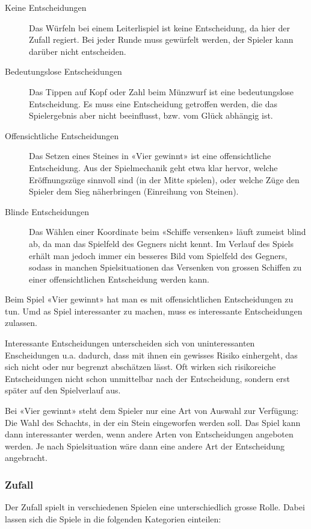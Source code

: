 \documentclass[a4paper,11pt,hidelinks]{scrartcl}
\begin{document}
\begin{description}
    \item[Keine Entscheidungen] Das Würfeln bei einem Leiterlispiel ist keine Entscheidung, da hier der Zufall regiert. Bei jeder Runde muss gewürfelt werden, der Spieler kann darüber nicht entscheiden.
    \item[Bedeutungslose Entscheidungen] Das Tippen auf Kopf oder Zahl beim Münzwurf ist eine bedeutungslose Entscheidung. Es muss eine Entscheidung getroffen werden, die das Spielergebnis aber nicht beeinflusst, bzw. vom Glück abhängig ist.
    \item[Offensichtliche Entscheidungen] Das Setzen eines Steines in «Vier gewinnt» ist eine offensichtliche Entscheidung. Aus der Spielmechanik geht etwa klar hervor, welche Eröffnungszüge sinnvoll sind (in der Mitte spielen), oder welche Züge den Spieler dem Sieg näherbringen (Einreihung von Steinen).
    \item[Blinde Entscheidungen] Das Wählen einer Koordinate beim «Schiffe versenken» läuft zumeist blind ab, da man das Spielfeld des Gegners nicht kennt. Im Verlauf des Spiels erhält man jedoch immer ein besseres Bild vom Spielfeld des Gegners, sodass in manchen Spielsituationen das Versenken von grossen Schiffen zu einer offensichtlichen Entscheidung werden kann.
\end{description}

Beim Spiel «Vier gewinnt» hat man es mit offensichtlichen Entscheidungen zu tun. Umd as Spiel interessanter zu machen, muss es interessante Entscheidungen zulassen.

Interessante Entscheidungen unterscheiden sich von uninteressanten Enscheidungen u.a. dadurch, dass mit ihnen ein gewisses Risiko einhergeht, das sich nicht oder nur begrenzt abschätzen lässt. Oft wirken sich risikoreiche Entscheidungen nicht schon unmittelbar nach der Entscheidung, sondern erst später auf den Spielverlauf aus.

Bei «Vier gewinnt» steht dem Spieler nur eine Art von Auswahl zur Verfügung: Die Wahl des Schachts, in der ein Stein eingeworfen werden soll. Das Spiel kann dann interessanter werden, wenn andere Arten von Entscheidungen angeboten werden. Je nach Spielsituation wäre dann eine andere Art der Entscheidung angebracht.

\subsubsection{Zufall}

Der Zufall spielt in verschiedenen Spielen eine unterschiedlich grosse Rolle. Dabei lassen sich die Spiele in die folgenden Kategorien einteilen:
\end{document}
